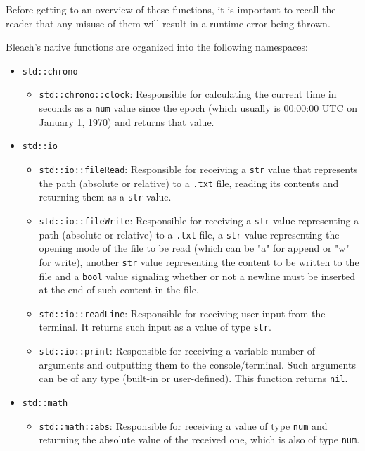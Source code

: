 Before getting to an overview of these functions, it is important to recall the reader that any misuse of them will result in a runtime error being thrown.

Bleach's native functions are organized into the following namespaces:

\begin{itemize}
    \item \texttt{std::chrono}
        \begin{itemize}
            \item \texttt{std::chrono::clock}: Responsible for calculating the current time in seconds as a \texttt{num} value since the epoch (which usually is 00:00:00 UTC on January 1, 1970) and returns that value.
        \end{itemize}
    \item \texttt{std::io}
        \begin{itemize}
            \item \texttt{std::io::fileRead}: Responsible for receiving a \texttt{str} value that represents the path (absolute or relative) to a \texttt{.txt} file, reading its contents and returning them as a \texttt{str} value.
            
            \item \texttt{std::io::fileWrite}: Responsible for receiving a \texttt{str} value representing a path (absolute or relative) to a \texttt{.txt} file, a \texttt{str} value representing the opening mode of the file to be read (which can be "a" for append or "w" for write), another \texttt{str} value representing the content to be written to the file and a \texttt{bool} value signaling whether or not a newline must be inserted at the end of such content in the file.
            
            \item \texttt{std::io::readLine}: Responsible for receiving user input from the terminal. It returns such input as a value of type \texttt{str}.
            
            \item \texttt{std::io::print}: Responsible for receiving a variable number of arguments and outputting them to the console/terminal. Such arguments can be of any type (built-in or user-defined). This function returns \texttt{nil}.
        \end{itemize}
    \item \texttt{std::math}
        \begin{itemize}
            \item \texttt{std::math::abs}: Responsible for receiving a value of type \texttt{num} and returning the absolute value of the received one, which is also of type \texttt{num}.


\end{itemize}
\end{itemize}
